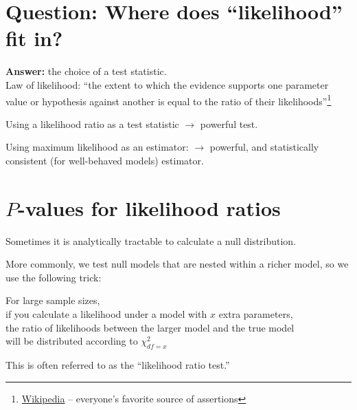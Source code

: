 \documentclass[landscape]{foils}
\begin{document}
\myNewSlide
\section*{Question: Where does ``likelihood'' fit in?}
{\bf Answer:} the choice of a test statistic.\\

Law of likelihood: ``the extent to which the evidence supports one parameter value or hypothesis against another is equal to the ratio of their likelihoods''\footnote{\href{https://en.wikipedia.org/wiki/Likelihood_principle#The_law_of_likelihood}{Wikipedia} -- everyone's favorite source of assertions}

Using a likelihood ratio as a test statistic $\rightarrow$ powerful test.

Using maximum likelihood as an estimator: $\rightarrow$ powerful, and statistically consistent (for well-behaved models) estimator.

\myNewSlide
\section*{$P$-values for likelihood ratios}

Sometimes it is analytically tractable to calculate a null distribution.

More commonly, we test null models that are nested within a richer model,
so we use the following trick:

For large sample sizes,\\
if you calculate a likelihood under a model with $x$ extra parameters, \\
the ratio of likelihoods between the larger model and the true model \\
will
be distributed according to $\chi^2_{df=x}$

This is often referred to as the ``likelihood ratio test.''
\end{document}
